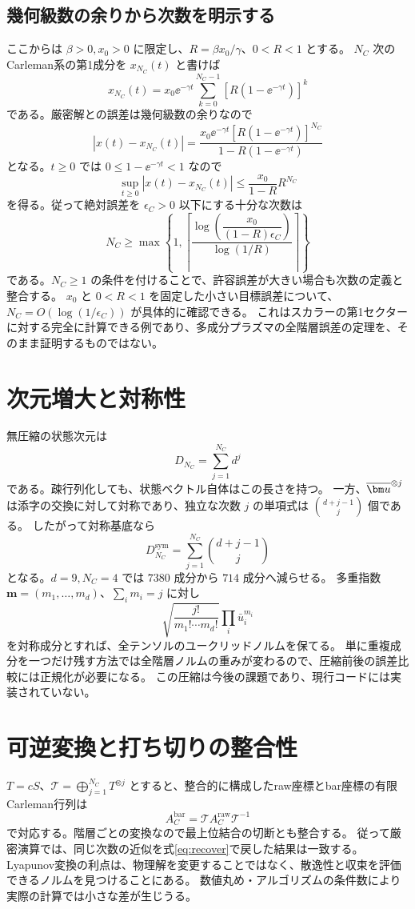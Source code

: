 \subsection{幾何級数の余りから次数を明示する}
ここからは $\beta>0,x_0>0$ に限定し、$R=\beta x_0/\gamma$、$0<R<1$ とする。
$N_C$ 次のCarleman系の第1成分を $x_{N_C}(t)$ と書けば
\[
\boxed{x_{N_C}(t)=x_0\ee^{-\gamma t}
\sum_{k=0}^{N_C-1}\left[R(1-\ee^{-\gamma t})\right]^k}
\]
である。厳密解との誤差は幾何級数の余りなので
\[
\boxed{|x(t)-x_{N_C}(t)|=
\frac{x_0\ee^{-\gamma t}\left[R(1-\ee^{-\gamma t})\right]^{N_C}}
{1-R(1-\ee^{-\gamma t})}}
\]
となる。$t\geq0$ では $0\leq1-\ee^{-\gamma t}<1$ なので
\[
\boxed{\sup_{t\geq0}|x(t)-x_{N_C}(t)|
\leq\frac{x_0}{1-R}R^{N_C}}
\]
を得る。従って絶対誤差を $\epsilon_C>0$ 以下にする十分な次数は
\[
\boxed{N_C\geq\max\left\{1,
\left\lceil\frac{\log\!\left(\dfrac{x_0}{(1-R)\epsilon_C}\right)}
{\log(1/R)}\right\rceil\right\}}
\]
である。$N_C\geq1$ の条件を付けることで、許容誤差が大きい場合も次数の定義と整合する。
$x_0$ と $0<R<1$ を固定した小さい目標誤差について、$N_C=O(\log(1/\epsilon_C))$ が具体的に確認できる。
これはスカラーの第1セクターに対する完全に計算できる例であり、多成分プラズマの全階層誤差の定理を、そのまま証明するものではない。

\section{次元増大と対称性}
無圧縮の状態次元は
\begin{equation}
D_{N_C}=\sum_{j=1}^{N_C}d^j
\end{equation}
である。疎行列化しても、状態ベクトル自体はこの長さを持つ。
一方、$\bu^{\otimes j}$ は添字の交換に対して対称であり、独立な次数 $j$ の単項式は $\binom{d+j-1}{j}$ 個である。
したがって対称基底なら
\begin{equation}
D_{N_C}^{\mathrm{sym}}=\sum_{j=1}^{N_C}\binom{d+j-1}{j}
\end{equation}
となる。$d=9,N_C=4$ では $7380$ 成分から $714$ 成分へ減らせる。
多重指数 $\bm m=(m_1,\ldots,m_d)$、$\sum_i m_i=j$ に対し
\[
\sqrt{\frac{j!}{m_1!\cdots m_d!}}\prod_i\bar u_i^{m_i}
\]
を対称成分とすれば、全テンソルのユークリッドノルムを保てる。
単に重複成分を一つだけ残す方法では全階層ノルムの重みが変わるので、圧縮前後の誤差比較には正規化が必要になる。
この圧縮は今後の課題であり、現行コードには実装されていない。

\section{可逆変換と打ち切りの整合性}
$T=cS$、$\mathcal T=\bigoplus_{j=1}^{N_C}T^{\otimes j}$ とすると、整合的に構成したraw座標とbar座標の有限Carleman行列は
\[
A_C^{\mathrm{bar}}=\mathcal T A_C^{\mathrm{raw}}\mathcal T^{-1}
\]
で対応する。階層ごとの変換なので最上位結合の切断とも整合する。
従って厳密演算では、同じ次数の近似を式\eqref{eq:recover}で戻した結果は一致する。
Lyapunov変換の利点は、物理解を変更することではなく、散逸性と収束を評価できるノルムを見つけることにある。
数値丸め・アルゴリズムの条件数により実際の計算では小さな差が生じうる。

